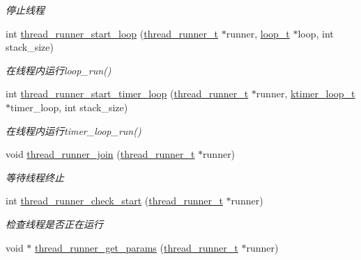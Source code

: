 \begin{DoxyCompactItemize}
\begin{DoxyCompactList}\small\item\em 停止线程 \end{DoxyCompactList}\item 
int \hyperlink{a00107_ga93f88ba77e7eab786da6fe7d1f681a2e_ga93f88ba77e7eab786da6fe7d1f681a2e}{thread\+\_\+runner\+\_\+start\+\_\+loop} (\hyperlink{a00050_a9054159cde2f926ef61c28ce1e555199_a9054159cde2f926ef61c28ce1e555199}{thread\+\_\+runner\+\_\+t} $\ast$runner, \hyperlink{a00050_a9c3ad1cd2de83e09f3a7b59fa82c94ee_a9c3ad1cd2de83e09f3a7b59fa82c94ee}{loop\+\_\+t} $\ast$loop, int stack\+\_\+size)
\begin{DoxyCompactList}\small\item\em 在线程内运行loop\+\_\+run() \end{DoxyCompactList}\item 
int \hyperlink{a00107_ga9191991e2bd7f91fe68324c2855d581d_ga9191991e2bd7f91fe68324c2855d581d}{thread\+\_\+runner\+\_\+start\+\_\+timer\+\_\+loop} (\hyperlink{a00050_a9054159cde2f926ef61c28ce1e555199_a9054159cde2f926ef61c28ce1e555199}{thread\+\_\+runner\+\_\+t} $\ast$runner, \hyperlink{a00050_a024af2aa29615e7a811ea6c45438157d_a024af2aa29615e7a811ea6c45438157d}{ktimer\+\_\+loop\+\_\+t} $\ast$timer\+\_\+loop, int stack\+\_\+size)
\begin{DoxyCompactList}\small\item\em 在线程内运行timer\+\_\+loop\+\_\+run() \end{DoxyCompactList}\item 
void \hyperlink{a00107_ga813a718c56e0923be9396630c8460794_ga813a718c56e0923be9396630c8460794}{thread\+\_\+runner\+\_\+join} (\hyperlink{a00050_a9054159cde2f926ef61c28ce1e555199_a9054159cde2f926ef61c28ce1e555199}{thread\+\_\+runner\+\_\+t} $\ast$runner)
\begin{DoxyCompactList}\small\item\em 等待线程终止 \end{DoxyCompactList}\item 
int \hyperlink{a00107_ga95c00ec3d6ef1710cc8d8bb8cb7e585d_ga95c00ec3d6ef1710cc8d8bb8cb7e585d}{thread\+\_\+runner\+\_\+check\+\_\+start} (\hyperlink{a00050_a9054159cde2f926ef61c28ce1e555199_a9054159cde2f926ef61c28ce1e555199}{thread\+\_\+runner\+\_\+t} $\ast$runner)
\begin{DoxyCompactList}\small\item\em 检查线程是否正在运行 \end{DoxyCompactList}\item 
void $\ast$ \hyperlink{a00107_gaf67fa2b2cfefc2de422a31b9dfad2bca_gaf67fa2b2cfefc2de422a31b9dfad2bca}{thread\+\_\+runner\+\_\+get\+\_\+params} (\hyperlink{a00050_a9054159cde2f926ef61c28ce1e555199_a9054159cde2f926ef61c28ce1e555199}{thread\+\_\+runner\+\_\+t} $\ast$runner)

\end{DoxyCompactItemize}
